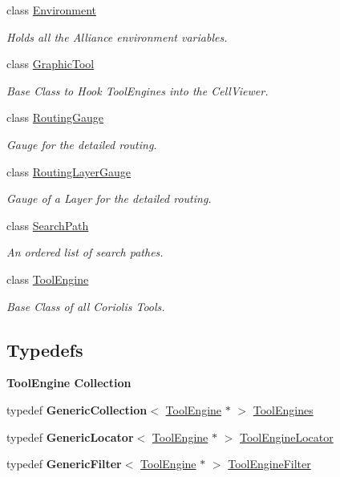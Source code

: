 \begin{DoxyCompactItemize}
class \hyperlink{classCRL_1_1Environment}{Environment}
\begin{DoxyCompactList}\small\item\em Holds all the Alliance environment variables. \end{DoxyCompactList}\item 
class \hyperlink{classCRL_1_1GraphicTool}{Graphic\+Tool}
\begin{DoxyCompactList}\small\item\em Base Class to Hook Tool\+Engines into the Cell\+Viewer. \end{DoxyCompactList}\item 
class \hyperlink{classCRL_1_1RoutingGauge}{Routing\+Gauge}
\begin{DoxyCompactList}\small\item\em Gauge for the detailed routing. \end{DoxyCompactList}\item 
class \hyperlink{classCRL_1_1RoutingLayerGauge}{Routing\+Layer\+Gauge}
\begin{DoxyCompactList}\small\item\em Gauge of a Layer for the detailed routing. \end{DoxyCompactList}\item 
class \hyperlink{classCRL_1_1SearchPath}{Search\+Path}
\begin{DoxyCompactList}\small\item\em An ordered list of search pathes. \end{DoxyCompactList}\item 
class \hyperlink{classCRL_1_1ToolEngine}{Tool\+Engine}
\begin{DoxyCompactList}\small\item\em Base Class of all Coriolis Tools. \end{DoxyCompactList}\end{DoxyCompactItemize}
\subsection*{Typedefs}
\begin{Indent}\textbf{ Tool\+Engine Collection}\par
\begin{DoxyCompactItemize}
\item 
typedef \textbf{ Generic\+Collection}$<$ \hyperlink{classCRL_1_1ToolEngine}{Tool\+Engine} $\ast$ $>$ \hyperlink{namespaceCRL_ae49bc0c5f113bba964680768556dd1b3}{Tool\+Engines}
\item 
typedef \textbf{ Generic\+Locator}$<$ \hyperlink{classCRL_1_1ToolEngine}{Tool\+Engine} $\ast$ $>$ \hyperlink{namespaceCRL_a9c6426dc361a7b02fc55b7c19401c7aa}{Tool\+Engine\+Locator}
\item 
typedef \textbf{ Generic\+Filter}$<$ \hyperlink{classCRL_1_1ToolEngine}{Tool\+Engine} $\ast$ $>$ \hyperlink{namespaceCRL_a976ed6ed06b1c3510c696de4c8960971}{Tool\+Engine\+Filter}
\end{DoxyCompactItemize}
\end{Indent}



